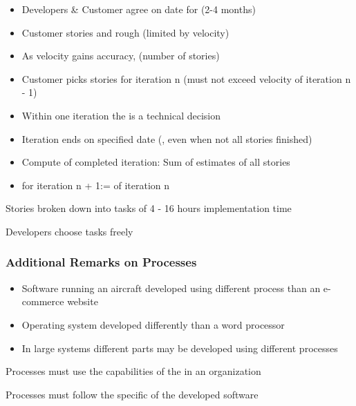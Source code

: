 \documentclass[
    ../../Software_Engineering_Summary.tex,
]
{subfiles}
\begin{document}
\begin{defbox}
    \begin{itemize}
        \item Developers \& Customer agree on date for  (2-4 months)
        \item Customer  stories and rough  (limited by velocity)
        \item As velocity gains accuracy,  (number of stories)
    \end{itemize}
\end{defbox}

\begin{defbox}
    \begin{itemize}
        \item Customer picks stories for iteration n (must not exceed velocity of iteration n - 1)
        \item Within one iteration the  is a technical decision
        \item Iteration ends on specified date (, even when not all stories finished)
        \item Compute  of completed iteration: Sum of estimates of all  stories
        \item {} for iteration n + 1:=  of iteration n
    \end{itemize}
\end{defbox}

\begin{defbox}
    Stories broken down into tasks of 4 - 16 hours implementation time

    Developers choose tasks freely
\end{defbox}

\subsubsection{Additional Remarks on Processes}
\begin{defbox}
    \begin{itemize}
        \item Software running an aircraft developed using different process than an e-commerce website
        \item Operating system developed differently than a word processor
        \item In large systems different parts may be developed using different processes
    \end{itemize}
\end{defbox}

\begin{defbox}
    Processes must use the capabilities of the  in an organization

    Processes must follow the specific  of the developed software
\end{defbox}
\end{document}
